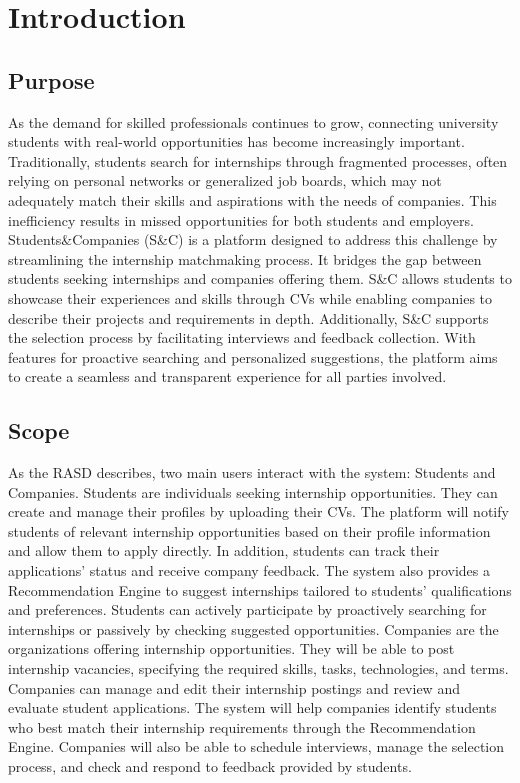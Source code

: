 \chapter{Introduction}
\label{ch:intro}

\section{Purpose }
As the demand for skilled professionals continues to grow, connecting university students with real-world opportunities has become increasingly important. Traditionally, students search for internships through fragmented processes, often relying on personal networks or generalized job boards, which may not adequately match their skills and aspirations with the needs of companies. This inefficiency results in missed opportunities for both students and employers.\newline
Students\&Companies (S\&C) is a platform designed to address this challenge by streamlining the internship matchmaking process. It bridges the gap between students seeking internships and companies offering them. S\&C allows students to showcase their experiences and skills through CVs while enabling companies to describe their projects and requirements in depth.\newline
Additionally, S\&C supports the selection process by facilitating interviews and feedback collection. With features for proactive searching and personalized suggestions, the platform aims to create a seamless and transparent experience for all parties involved.

\section{Scope}
As the RASD describes, two main users interact with the system: Students and Companies. \newline Students are individuals seeking internship opportunities. They can create and manage their profiles by uploading their CVs. The platform will notify students of relevant internship opportunities based on their profile information and allow them to apply directly. In addition, students can track their applications' status and receive company feedback. The system also provides a Recommendation Engine to suggest internships tailored to students' qualifications and preferences. Students can actively participate by proactively searching for internships or passively by checking suggested opportunities.\newline
Companies are the organizations offering internship opportunities. They will be able to post internship vacancies, specifying the required skills, tasks, technologies, and terms. Companies can manage and edit their internship postings and review and evaluate student applications. The system will help companies identify students who best match their internship requirements through the Recommendation Engine. Companies will also be able to schedule interviews, manage the selection process, and check and respond to feedback provided by students.


